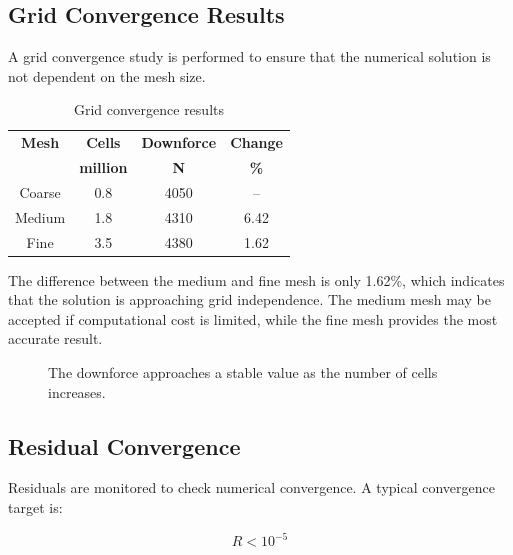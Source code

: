 \documentclass[12pt,a4paper]{article}
\begin{document}
\subsection{Grid Convergence Results}

A grid convergence study is performed to ensure that the numerical solution is not dependent on the mesh size.

\begin{table}[H]
\centering
\caption{Grid convergence results}
\begin{tabular}{cccc}
\toprule
\textbf{Mesh} & \textbf{Cells} & \textbf{Downforce} & \textbf{Change} \\
 & \textbf{million} & \textbf{N} & \textbf{\%} \\
\midrule
Coarse & 0.8 & 4050 & -- \\
Medium & 1.8 & 4310 & 6.42 \\
Fine & 3.5 & 4380 & 1.62 \\
\bottomrule
\end{tabular}
\end{table}

The difference between the medium and fine mesh is only 1.62\%, which indicates that the solution is approaching grid independence. The medium mesh may be accepted if computational cost is limited, while the fine mesh provides the most accurate result.

\begin{figure}[H]
\centering
{}
\caption{The downforce approaches a stable value as the number of cells increases.}
\end{figure}

\subsection{Residual Convergence}

Residuals are monitored to check numerical convergence. A typical convergence target is:

\begin{equation}
    R < 10^{-5}
\end{equation}
\end{document}
